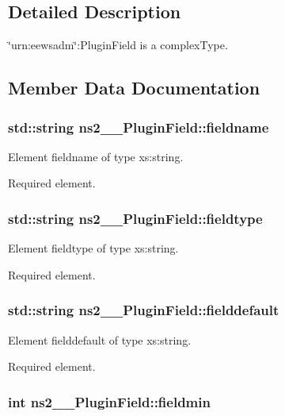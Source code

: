 \subsection{Detailed Description}
\char`\"{}urn:eewsadm\char`\"{}:PluginField is a complexType. 

\subsection{Member Data Documentation}
\subsubsection{\setlength{\rightskip}{0pt plus 5cm}std::string {\bf ns2\_\-\_\-PluginField::fieldname}}\label{classns2____PluginField_3e30f875a654bbf637c03284d2736391}


Element fieldname of type xs:string. 

Required element. 
\subsubsection{\setlength{\rightskip}{0pt plus 5cm}std::string {\bf ns2\_\-\_\-PluginField::fieldtype}}\label{classns2____PluginField_8042b3b176fd4575a2d7b75b469c2085}


Element fieldtype of type xs:string. 

Required element. 
\subsubsection{\setlength{\rightskip}{0pt plus 5cm}std::string {\bf ns2\_\-\_\-PluginField::fielddefault}}\label{classns2____PluginField_094740e83cfd0ca6aabf634c2b3760e5}


Element fielddefault of type xs:string. 

Required element. 
\subsubsection{\setlength{\rightskip}{0pt plus 5cm}int {\bf ns2\_\-\_\-PluginField::fieldmin}}\label{classns2____PluginField_7a1baa9490c60ac9f514740bf7a796fc}


